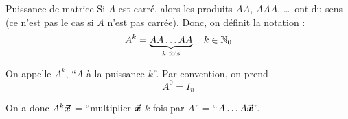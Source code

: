 \documentclass[a4paper]{article}
\begin{document}
\begin{parag}{Puissance de matrice}
    Si $A$ est carré, alors les produits $AA$, $A A A$, \ldots\ ont du sens (ce n'est pas le cas si $A$ n'est pas carrée). Donc, on définit la notation :
    \[A^{k} = \underbrace{A A \ldots A A}_{k\text{ fois}} \quad k \in \mathbb{N}_0\]

    On appelle $A^{k}$, ``$A$ à la puissance $k$''.  Par convention, on prend
    \[A^{0} = I_n\]

    On a donc $A^{k} \bm{\protect\vec{x}}$ = ``multiplier $\bm{\protect\vec{x}}$ $k$ fois par $A$'' = ``$A \ldots A \bm{\protect\vec{x}}$''.
\end{parag}
\end{document}
